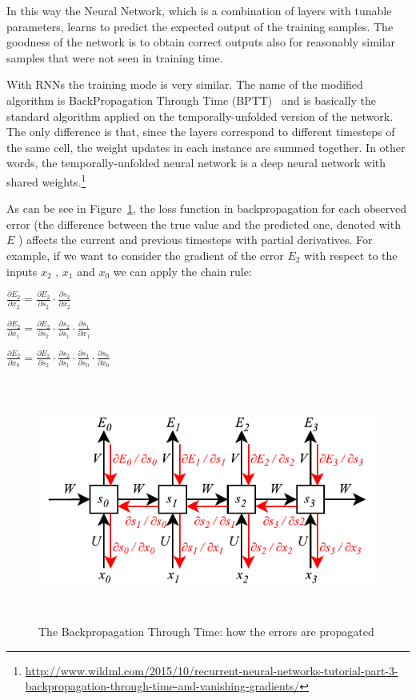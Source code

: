 In this way the Neural Network, which is a combination of layers with tunable parameters, learns to predict the expected output of the training samples. The goodness of the network is to obtain correct outputs also for reasonably similar samples that were not seen in training time.

With RNNs the training mode is very similar. The name of the modified algorithm is BackPropagation Through Time (BPTT)~\cite{werbos1990backpropagation} and is basically the standard algorithm applied on the temporally-unfolded version of the network. The only difference is that, since the layers correspond to different timesteps of the same cell, the weight updates in each instance are summed together. In other words, the temporally-unfolded neural network is a deep neural network with shared weights.\footnote{\url{http://www.wildml.com/2015/10/recurrent-neural-networks-tutorial-part-3-backpropagation-through-time-and-vanishing-gradients/}}

As can be see in Figure~\ref{fig:bptt}, the loss function in backpropagation for each observed error (the difference between the true value and the predicted one, denoted with  \( E \) ) affects the current and previous timesteps with partial derivatives. For example, if we want to consider the gradient of the error  \( E_{2} \) with respect to the inputs  \( x_{2} \) ,  \( x_{1} \) and  \( x_{0} \)  we can apply the chain rule:

 \(  \frac{ \partial E_{2}}{ \partial x_{2}}=\frac{ \partial E_{2}}{ \partial s_{2}}\cdot \frac{ \partial s_{2}}{ \partial x_{2}} \) 

 \(  \frac{ \partial E_{2}}{ \partial x_{1}}=\frac{ \partial E_{2}}{ \partial s_{2}}\cdot \frac{ \partial s_{2}}{ \partial s_{1}}\cdot \frac{ \partial s_{1}}{ \partial x_{1}} \) 

 \(  \frac{ \partial E_{2}}{ \partial x_{0}}=\frac{ \partial E_{2}}{ \partial s_{2}}\cdot \frac{ \partial s_{2}}{ \partial s_{1}}\cdot \frac{ \partial s_{1}}{ \partial s_{0}}\cdot \frac{ \partial s_{0}}{ \partial x_{0}} \) 


\begin{figure}[!htbp]
    \centering
    \includegraphics[max width=\linewidth,max height=8cm,keepaspectratio]{figures/bptt}
    \caption{The Backpropagation Through Time: how the errors are propagated}\label{fig:bptt}
\end{figure}

